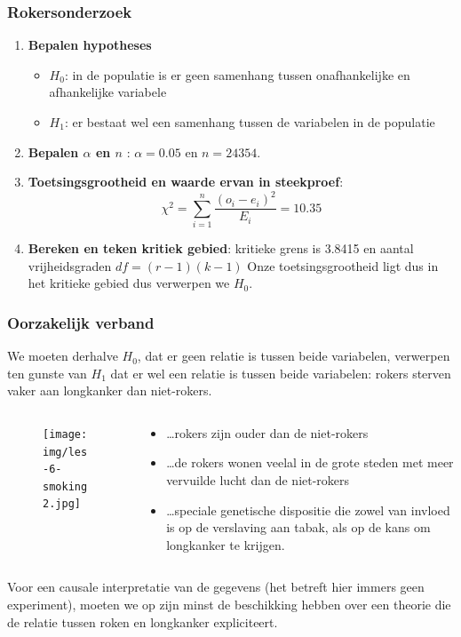 \begin{frame}
	\frametitle{Rokersonderzoek}
	\begin{enumerate}
		\item \textbf{Bepalen hypotheses}
		\begin{itemize}
			\item $H_{0}$: in de populatie is er geen samenhang tussen onafhankelijke en afhankelijke variabele
			\item $H_{1}$: er bestaat wel een samenhang tussen de variabelen in de populatie
		\end{itemize}
		\item \textbf{Bepalen $\alpha$ en $n$} : $\alpha = 0.05$ en $n = 24354$.
		\item \textbf{Toetsingsgrootheid en waarde ervan in steekproef}:
		\[ \chi^{2} = \sum_{i=1}^{n} \frac{(o_{i} - e_{i})^{2}}{E_{i}} = 10.35 \]
		\item \textbf{Bereken en teken kritiek gebied}:  kritieke grens is 3.8415 en aantal vrijheidsgraden $df = (r-1)(k-1)$ Onze toetsingsgrootheid ligt dus in het kritieke gebied dus verwerpen we $H_{0}$.
	\end{enumerate}
\end{frame}

\begin{frame}
	\frametitle{Oorzakelijk verband}
	We moeten derhalve $H_{0}$, dat er geen relatie is tussen beide variabelen, verwerpen ten gunste van $H_{1}$ dat er wel een relatie is tussen beide variabelen: rokers sterven vaker aan longkanker dan niet-rokers.
	\begin{columns}
		\begin{column}{0.3 \textwidth}
			
			\begin{figure}
				\centering
				\texttt{[image: img/les-6-smoking2.jpg]}
			\end{figure}
			
		\end{column}
		\begin{column}{0.7 \textwidth}
			
			\begin{itemize}
				\item  \dots rokers zijn ouder dan de niet-rokers
				\item \dots de rokers wonen veelal in de grote steden met
				meer vervuilde lucht dan de niet-rokers
				\item \dots speciale genetische dispositie die zowel van invloed is op de verslaving aan tabak, als op de kans om longkanker te krijgen.
			\end{itemize}
		\end{column}
	\end{columns}
	Voor een causale interpretatie van de gegevens (het betreft hier immers geen experiment), moeten we op zijn minst de beschikking hebben over een theorie die de relatie tussen roken en longkanker expliciteert.
	
\end{frame}



